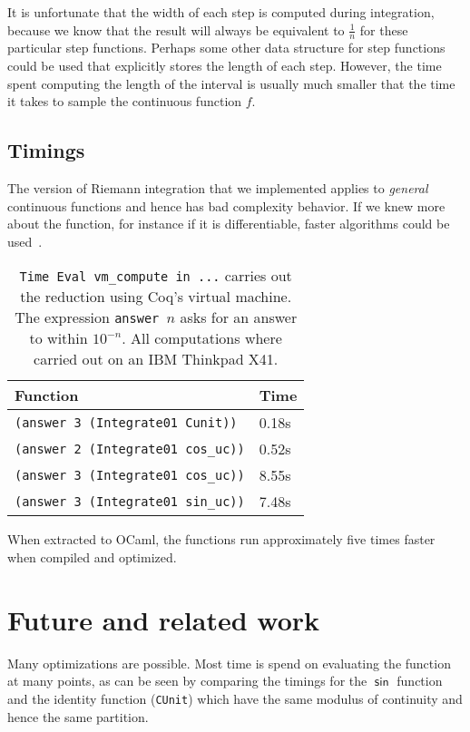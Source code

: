 \documentclass{elsarticle}
\newcommand{\tmstrong}[1]{\textbf{#1}}
\newcommand{\tmtextit}[1]{{\itshape{#1}}}
\begin{document}
It is unfortunate that the width of each step is computed during integration,
because we know that the result will always be equivalent to $\frac{1}{n}$ for
these particular step functions. Perhaps some other data structure for step
functions could be used that explicitly stores the length of each step.
However, the time spent computing the length of the interval is usually much
smaller that the time it takes to sample the continuous function $f$.

\subsection{Timings}The version of Riemann integration that we implemented
applies to \tmtextit{general} continuous functions and hence has bad
complexity behavior. If we knew more about the function, for instance if it is
differentiable, faster algorithms could be used~{\cite{edalat:1999}}.

\begin{table}[h]
\begin{center}
  \begin{tabular}{|l|l|}
    \hline
    {\tmstrong{Function}} & {\tmstrong{Time}}\\
    \hline
    {\texttt{(answer 3 (Integrate01 Cunit))}} & 0.18s\\
    \hline
    {\texttt{(answer 2 (Integrate01 cos\_uc))}} & 0.52s\\
    \hline
    {\texttt{(answer 3 (Integrate01 cos\_uc))}} & 8.55s\\
    \hline
    {\texttt{(answer 3 (Integrate01 sin\_uc))}} & 7.48s\\
    \hline
  \end{tabular}
\end{center}
  \caption{{\texttt{Time Eval vm\_compute in ...}} carries out the reduction
  using Coq's virtual machine. The expression {\texttt{answer $n$}} asks for an
  answer to within $10^{- n}$. All computations where carried out on an IBM
  Thinkpad X41.}
\end{table}

When extracted to OCaml, the functions run approximately five times faster
when compiled and optimized.

\section{Future and related work}

Many optimizations are possible. Most time is spend on evaluating the function
at many points, as can be seen by comparing the timings for the
$\mathsf{\sin}$ function and the identity function ({\texttt{CUnit}}) which
have the same modulus of continuity and hence the same partition.
\end{document}
